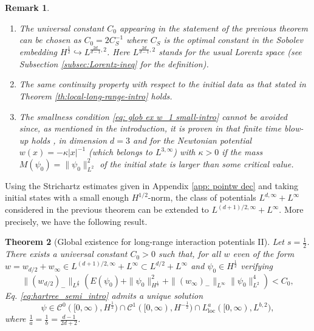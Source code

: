 \documentclass[12pt]{article}
\theoremstyle{plain}
\newtheorem{theo}{Theorem}[section]
\newtheorem{rem}[theo]{Remark}
\begin{document}
\begin{rem}$ $
\begin{enumerate}
\item The universal constant $C_0$ appearing in the statement of the previous theorem can be chosen as $C_0=2C_S^{-1}$ where $C_{S}$ is the optimal constant in the Sobolev embedding $H^{\frac12} \hookrightarrow L^{\frac{2d}{d-1},2}$. Here $L^{\frac{2d}{d-1},2}$ stands for the usual Lorentz space (see Subsection \ref{subsec:Lorentz-ineq} for the definition).
\item The same continuity property with respect to the initial data as that stated in Theorem \ref{th:local-long-range-intro} holds.
\item The smallness condition \eqref{eq: glob ex w_1 small-intro} cannot be avoided since, as mentioned in the introduction, it is proven in \cite{frohlich_lenzm07} that finite time blow-up holds , in dimension $d=3$ and for the Newtonian potential $w(x)=-\kappa|x|^{-1}$ (which belongs to $L^{3,\infty}$) with $\kappa>0$ if the mass $M(\psi_0)=\|\psi_0\|_{L^2}^2$ of the initial state is larger than some critical value.
\end{enumerate}
\end{rem}

Using the Strichartz estimates given in Appendix \ref{app: pointw dec} and taking initial states with a small enough $H^{1/2}$-norm, the class of potentials $L^{d,\infty}+L^\infty$ considered in the previous theorem can be extended to $L^{(d+1)/2,\infty}+L^\infty$. More precisely, we have the following result.

\begin{theo}[Global existence for long-range interaction potentials II]\label{th:global-long-range-intro-small-energy-opt}
	Let $s=\frac12$. There exists a universal constant $C_0>0$ such that, for all $w$ even of the form $w = w_{d/2} + w_\infty \in L^{(d+1)/2,\infty} + L^\infty\subset L^{d/2}+L^\infty$ and $\psi_0 \in H^{\frac12}$ verifying
	\begin{equation*}
	    \| (w_{d/2})_-\|_{L^{\frac{d}2}}(E(\psi_0)+\|\psi_0\|^2_{H^{\frac12}}+\|(w_\infty)_-\|_{L^\infty}\|\psi_0\|^4_{L^{2}})<C_0 ,
	\end{equation*}
	Eq. \eqref{eq:hartree_semi_intro} admits a unique solution 
	\begin{equation*}
		\psi \in \mathcal{C}^0([0,\infty), H^{\frac12}) \cap \mathcal{C}^1 ([0,\infty), H^{-\frac12})\cap L^a_{\mathrm{loc}}([0,\infty),L^{b,2}),
	\end{equation*}
	where $\frac1a=\frac1b=\frac{d-1}{2d+2}$.
\end{theo}
\end{document}

